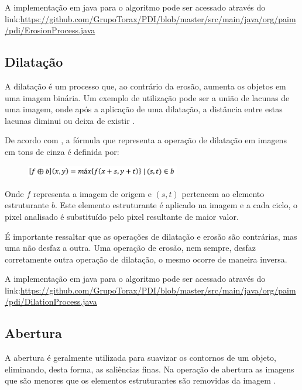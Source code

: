 \documentclass[
	12pt,				%
	oneside,			%
	a4paper,			%
	english,			%
	french,				%
	spanish,			%
	brazil,				%
	]{abntex2}
\begin{document}
A implementação em java para o algoritmo pode ser acessado através do link:\url{https://github.com/GrupoTorax/PDI/blob/master/src/main/java/org/paim/pdi/ErosionProcess.java}

\subsection{Dilatação}

A dilatação é um processo que, ao contrário da erosão, aumenta os objetos em uma imagem binária. Um exemplo de utilização pode ser a união de lacunas de uma imagem, onde após a aplicação de uma dilatação, a distância entre estas lacunas diminui ou deixa de existir \cite{gonzalesWoods:2008}. 

De acordo com \citet{pedriniSchwartz:2008}, a fórmula que representa a operação de dilatação em imagens em tons de cinza é definida por:

\begin{figure}[ht]
\centering
\includegraphics[width=0.6\textwidth]{imagens/dilatacao_formula.png}
\end{figure}

Onde \(f\) representa a imagem de origem e \((s, t)\) pertencem ao elemento estruturante \(b\). Este elemento estruturante é aplicado na imagem e a cada ciclo, o pixel analisado é substituído pelo pixel resultante de maior valor.

É importante ressaltar que as operações de dilatação e erosão são contrárias, mas uma não desfaz a outra. Uma operação de erosão, nem sempre, desfaz corretamente outra operação de dilatação, o mesmo ocorre de maneira inversa.

A implementação em java para o algoritmo pode ser acessado através do link:\url{https://github.com/GrupoTorax/PDI/blob/master/src/main/java/org/paim/pdi/DilationProcess.java}

\subsection{Abertura}

A abertura é geralmente utilizada para suavizar os contornos de um objeto, eliminando, desta forma, as saliências finas. Na operação de abertura as imagens que são menores que os elementos estruturantes são removidas da imagem \cite{gonzalesWoods:2008}.
\end{document}
